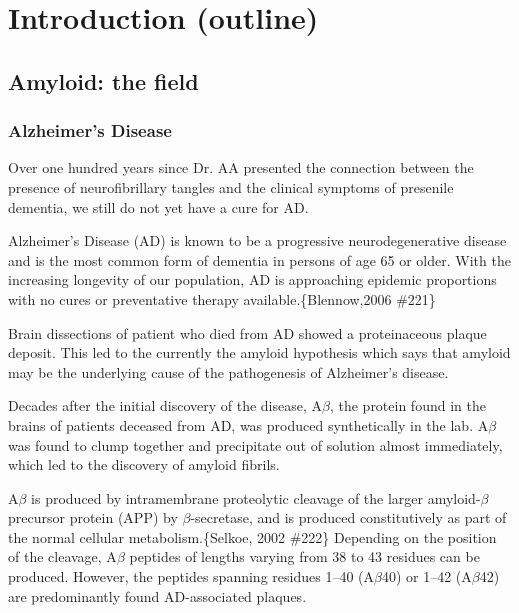 \chapter{Introduction (outline)}

\section{Amyloid: the field}


\subsection{Alzheimer's Disease}
\begin{outline}[enumerate]
\1 Over one hundred years since Dr. AA presented the connection between the presence of neurofibrillary tangles and the clinical symptoms of presenile dementia, we still do not yet have a cure for AD.

\1 Alzheimer's Disease (AD) is known to be a progressive neurodegenerative disease and is the most common form of dementia in persons of age 65 or older. With the increasing longevity of our population, AD is approaching epidemic proportions with no cures or preventative therapy available.\{Blennow,2006 \#221\}

\1 Brain dissections of patient who died from AD showed a proteinaceous plaque deposit.  This led to the currently the amyloid hypothesis which says that amyloid may be the underlying cause of the pathogenesis of Alzheimer's disease.  

\1 Decades after the initial discovery of the disease, A$\beta$, the protein found in the brains of patients deceased from AD, was produced synthetically in the lab. A$\beta$ was found to clump together and precipitate out of solution almost immediately, which led to the discovery of amyloid fibrils.

	\2 A$\beta$ is produced by intramembrane proteolytic cleavage of the larger amyloid-$\beta$ precursor protein (APP) by $\beta$-secretase, and is produced constitutively as part of the normal cellular metabolism.\{Selkoe, 2002 \#222\} Depending on the position of the cleavage, A$\beta$ peptides of lengths varying from 38 to 43 residues can be produced. However, the peptides spanning residues 1--40 (A$\beta$40) or 1--42 (A$\beta$42) are predominantly found AD-associated plaques.
\end{outline}


